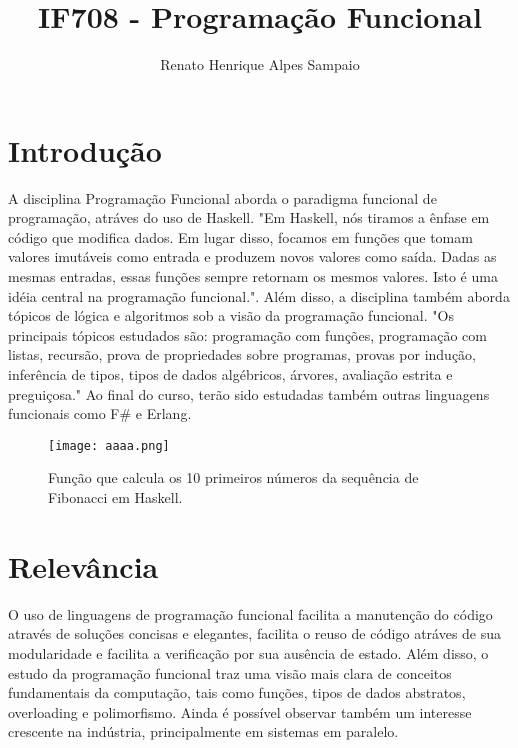 \documentclass{article}
\title{IF708 - Programação Funcional}
\author{Renato Henrique Alpes Sampaio}
\date{}
\begin{document}
\maketitle

\section{Introdução}
A disciplina Programação Funcional aborda o paradigma funcional de programação, atráves do uso de Haskell. "Em Haskell, nós tiramos a ênfase em código que modifica dados. Em lugar disso, focamos em funções que tomam valores imutáveis como entrada e produzem novos valores como saída. Dadas as mesmas entradas, essas funções sempre retornam os mesmos valores. Isto é uma idéia central na programação funcional."\citep{bryan2008realworldhaskell}. Além disso, a disciplina também aborda tópicos de lógica e algoritmos sob a visão da programação funcional. "Os principais tópicos estudados são: programação com funções, programação com listas, recursão, prova de propriedades sobre programas, provas por indução, inferência de tipos, tipos de dados algébricos, árvores, avaliação estrita e preguiçosa."\citep{homepage} Ao final do curso, terão sido estudadas também outras linguagens funcionais como F\# e Erlang.


\begin{figure}[h!]
\centering
\texttt{[image: aaaa.png]}
\caption{Função que calcula os 10 primeiros números da sequência de Fibonacci em Haskell.\citep{fibonacci}}
\end{figure}
\section{Relevância}
O uso de linguagens de programação funcional facilita a manutenção do código através de soluções concisas e elegantes, facilita o reuso de código atráves de sua modularidade e facilita a verificação por sua ausência de estado. Além disso, o estudo da programação funcional traz uma visão mais clara de conceitos fundamentais da computação, tais como funções, tipos de dados abstratos, overloading e polimorfismo. Ainda é possível observar também um interesse crescente na indústria, principalmente em sistemas em paralelo.\citep{slideintroducao}
\end{document}
